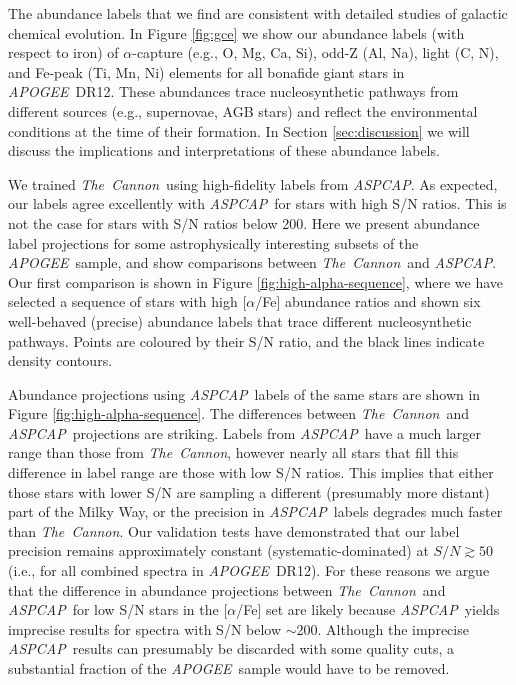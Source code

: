 \documentclass[12pt,preprint]{aastex}
\newcommand{\project}[1]{\textsl{#1}}
\newcommand{\TheCannon}{\project{The~Cannon}}
\newcommand{\acronym}[1]{{\small{#1}}}
\newcommand{\apogee}{\project{\acronym{APOGEE}}}
\newcommand{\aspcap}{\project{\acronym{ASPCAP}}}
\newcommand{\dr}{\acronym{DR12}}
\begin{document}
The abundance labels that we find are consistent with detailed studies
of galactic chemical evolution.  In Figure \ref{fig:gce} we show our abundance
labels (with respect to iron) of $\alpha$-capture (e.g., O, Mg, Ca, Si), odd-Z
(Al, Na), light (C, N), and Fe-peak (Ti, Mn, Ni) elements for all bonafide
giant stars in \apogee\ \dr.  These abundances trace nucleosynthetic pathways
from different sources (e.g., supernovae, AGB stars) and reflect the environmental
conditions at the time of their formation.  In Section \ref{sec:discussion} 
we will discuss the implications and interpretations of these abundance
labels.


We trained \TheCannon\ using high-fidelity labels from \aspcap.  As expected,
our labels agree excellently with \aspcap\ for stars with high S/N ratios.
This is not the case for stars with S/N ratios below 200.  Here we present
abundance label projections for some astrophysically interesting subsets of
the \apogee\ sample, and show comparisons between \TheCannon\ and \aspcap.
Our first comparison is shown in Figure \ref{fig:high-alpha-sequence}, where we have selected a sequence of stars with
high [$\alpha$/Fe] abundance ratios and shown six well-behaved (precise)
abundance labels that trace different nucleosynthetic pathways.  Points are
coloured by their S/N ratio, and the black lines indicate density contours.



Abundance projections using \aspcap\ labels of the same stars are shown
in Figure \ref{fig:high-alpha-sequence}.  The differences between \TheCannon\
and \aspcap\ projections are striking.  Labels
from \aspcap\ have a much larger range than those from \TheCannon,
however nearly all stars that fill this difference in label range are those
with low S/N ratios.  This implies that either those stars with lower S/N
are sampling a different (presumably more distant) part of the Milky Way,
or the precision in \aspcap\ labels degrades much faster than \TheCannon.
Our validation tests have demonstrated that our label precision remains
approximately constant (systematic-dominated) at $S/N \gtrsim 50$ (i.e.,
for all combined spectra in \apogee\ \dr).  For these reasons we argue
that the difference in abundance projections between \TheCannon\ and
\aspcap\ for low S/N stars in the [$\alpha$/Fe] set are likely because \aspcap\
yields imprecise results for spectra with S/N below $\sim$200.  Although
the imprecise \aspcap\ results can presumably be discarded with some 
quality cuts, a substantial fraction of the \apogee\ sample would have
to be removed.
\end{document}
